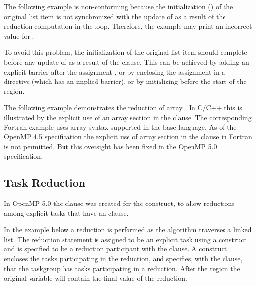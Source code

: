\fortranspecificend

The following example is non-conforming because the initialization () of the original list item  is not synchronized with the update of 
 as a result of the reduction computation in the  loop. Therefore, 
the example may print an incorrect value for .

To avoid this problem, the initialization of the original list item  
should complete before any update of  as a result of the  
clause. This can be achieved by adding an explicit barrier after the assignment 
, or by enclosing the assignment  in a  
directive (which has an implied barrier), or by initializing  before 
the start of the  region.



The following example demonstrates the reduction of array .  In C/C++ this is illustrated by the explicit use of an array section  in the  clause.  The corresponding Fortran example uses array syntax supported in the base language.  As of the OpenMP 4.5 specification the explicit use of array section in the  clause in Fortran is not permitted.  But this oversight has been fixed in the OpenMP 5.0 specification.




\subsection{Task Reduction}
\label{subsec:task_reduction}

In OpenMP 5.0 the  clause was created for the  construct, 
to allow reductions among explicit tasks that have an  clause.

In the  example below a reduction is performed as the algorithm
traverses a linked list. The reduction statement is assigned to be an explicit task using
a  construct and is specified to be a reduction participant with 
the  clause.
A  construct encloses the tasks participating in the reduction, and
specifies, with the  clause, that the taskgroup has tasks participating
in a reduction.  After the  region the original variable will contain 
the final value of the reduction.


